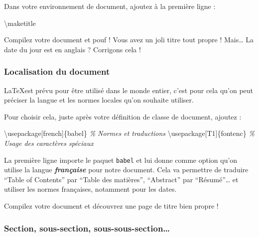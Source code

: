 \documentclass[A4paper
]{article}
\newenvironment{Shaded}{}{}
\newcommand{\BuiltInTok}[1]{#1}
\newcommand{\CommentTok}[1]{\textcolor[rgb]{0.38,0.63,0.69}{\textit{#1}}}
\newcommand{\ExtensionTok}[1]{#1}
\newcommand{\FunctionTok}[1]{\textcolor[rgb]{0.02,0.16,0.49}{#1}}
\newcommand{\NormalTok}[1]{#1}
\begin{document}
Dans votre environnement de document, ajoutez à la première ligne :

\begin{Shaded}
\begin{Highlighting}[]
\FunctionTok{\textbackslash{}maketitle}
\end{Highlighting}
\end{Shaded}

Compilez votre document et pouf ! Vous avez un joli titre tout propre !
Mais\ldots{} La date du jour est en anglais ? Corrigons cela !

\hypertarget{localisation-du-document}{%
\subsubsection{Localisation du
document}\label{localisation-du-document}}

\LaTeX est prévu pour être utilisé dans le monde entier, c'est pour cela
qu'on peut préciser la langue et les normes locales qu'on souhaite
utiliser.

Pour choisir cela, juste après votre définition de classe de document,
ajoutez :

\begin{Shaded}
\begin{Highlighting}[]
\BuiltInTok{\textbackslash{}usepackage}\NormalTok{[french]\{}\ExtensionTok{babel}\NormalTok{\} }\CommentTok{\% Normes et traductions}
\BuiltInTok{\textbackslash{}usepackage}\NormalTok{[T1]\{}\ExtensionTok{fontenc}\NormalTok{\} }\CommentTok{\% Usage des caractères spéciaux}
\end{Highlighting}
\end{Shaded}

La première ligne importe le paquet \texttt{babel} et lui donne comme
option qu'on utilise la langue \textbf{\emph{française}} pour notre
document. Cela va permettre de traduire ``Table of Contents'' par
``Table des matières'', ``Abstract'' par ``Résumé''\ldots{} et utiliser
les normes françaises, notamment pour les dates.

Compilez votre document et découvrez une page de titre bien propre !

\hypertarget{section-sous-section-sous-sous-section}{%
\subsubsection{Section, sous-section,
sous-sous-section\ldots{}}\label{section-sous-section-sous-sous-section}}
\end{document}
